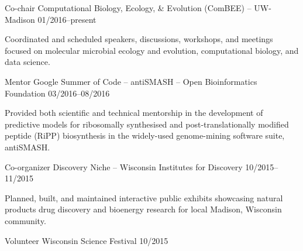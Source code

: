 

\begin{cventries}

  \cventry
    {Co-chair} %
    {Computational Biology, Ecology, \& Evolution (ComBEE) -- UW-Madison} %
    {} %
    {01/2016--present} %
    {
      \begin{cvitems} %
        \item {Coordinated and scheduled speakers, discussions, workshops, and meetings focused on molecular microbial ecology and evolution, computational biology, and data science.}
      \end{cvitems}
    }

  \cventry
    {Mentor} %
    {Google Summer of Code -- antiSMASH -- Open Bioinformatics Foundation} %
    {} %
    {03/2016--08/2016} %
    {
      \begin{cvitems} %
        \item {Provided both scientific and technical mentorship in the development of predictive models for ribosomally synthesised and post-translationally modified peptide (RiPP) biosynthesis in the widely-used genome-mining software suite, antiSMASH.}
      \end{cvitems}
    }
    
  \cventry
    {Co-organizer} %
    {Discovery Niche -- Wisconsin Institutes for Discovery} %
    {} %
    {10/2015--11/2015} %
    {
      \begin{cvitems} %
        \item {Planned, built, and maintained interactive public exhibits showcasing natural products drug discovery and bioenergy research for local Madison, Wisconsin community.}
      \end{cvitems}
    }
    
  \cventry
    {Volunteer} %
    {Wisconsin Science Festival} %
    {} %
    {10/2015} %
    {}
 

\end{cventries}
